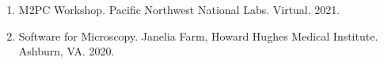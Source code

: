 \begin{enumerate}  
\item M2PC Workshop.  Pacific Northwest National Labs. Virtual. 2021.
\item Software for Microscopy.  Janelia Farm, Howard Hughes Medical Institute.  Ashburn, VA. 2020. 
\end{enumerate}